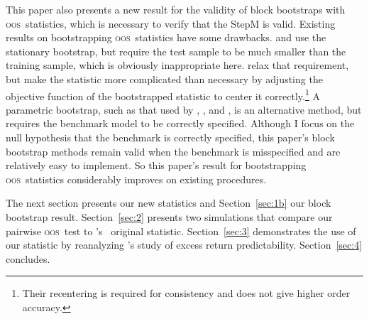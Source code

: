 \documentclass[12pt,fleqn]{article}
\newcommand\citepos[2][]{\citeauthor{#2}'s \citeyearpar[#1]{#2}}
\newcommand\poscw{\citeauthor{ClW:06}'s \citeyearpar{ClW:06,ClW:07}}
\theoremstyle{definition}
\newcommand{\oos}{\textsc{oos}}
\begin{document}
This paper also presents a new result for the validity of block
bootstraps with \oos\ statistics, which is necessary to verify that
the StepM is valid.  Existing results on bootstrapping \oos\
statistics have some drawbacks.  \citet{Whi:00} and \citet{Han:05} use
the stationary bootstrap, but require the test sample to be much
smaller than the training sample, which is obviously inappropriate
here.  \citet{CoS:07} relax that requirement, but make the statistic
more complicated than necessary by adjusting the objective function of
the bootstrapped statistic to center it correctly.\footnote{Their
  recentering is required for consistency and does not give higher
  order accuracy.}  A parametric bootstrap, such as that used by
\cite{Mar:95}, \cite{Lut:99}, and \citet{ClM:11}, is an alternative
method, but requires the benchmark model to be correctly specified.
Although I focus on the null hypothesis that the benchmark is
correctly specified, this paper's block bootstrap methods remain valid
when the benchmark is misspecified and are relatively easy to
implement.  So this paper's result for bootstrapping \oos\ statistics
considerably improves on existing procedures.

The next section presents our new statistics and Section~\ref{sec:1b}
our block bootstrap result.  Section~\ref{sec:2} presents two
simulations that compare our pairwise \oos\ test to \poscw\ original
statistic.  Section~\ref{sec:3} demonstrates the use of our statistic
by reanalyzing \citepos{GoW:08} study of excess return
predictability. Section~\ref{sec:4} concludes.
\end{document}
